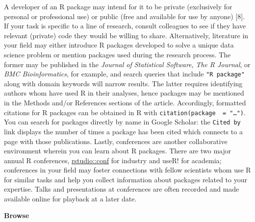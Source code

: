 \documentclass[10pt,letterpaper]{article}
\begin{document}
A developer of an R package may intend for it to be private (exclusively
for personal or professional use) or public (free and available for use
by anyone) {[}8{]}. If your task is specific to a line of research,
consult colleagues to see if they have relevant (private) code they
would be willing to share. Alternatively, literature in your field may
either introduce R packages developed to solve a unique data science
problem or mention packages used during the research process. The former
may be published in the \emph{Journal of Statistical Software},
\emph{The R Journal}, or \emph{BMC Bioinformatics}, for example, and
search queries that include \texttt{"R\ package"} along with domain
keywords will narrow results. The latter requires identifying authors
whom have used R in their analyses, hence packages may be mentioned in
the Methods and/or References sections of the article. Accordingly,
formatted citations for R packages can be obtained in R with
\texttt{citation(package\ \ =\ "\ldots{}")}. You can search for packages
directly by name in Google Scholar: the \texttt{Cited\ by} link displays
the number of times a package has been cited which connects to a page
with those publications. Lastly, conferences are another collaborative
environment wherein you can learn about R packages. There are two major
annual R conferences,
\href{https://rstudio.com/conference/}{rstudio::conf} for industry and
useR! for academia; conferences in your field may foster connections
with fellow scientists whom use R for similar tasks and help you collect
information about packages related to your expertise. Talks and
presentations at conferences are often recorded and made available
online for playback at a later date.

\textbf{Browse}
\end{document}
